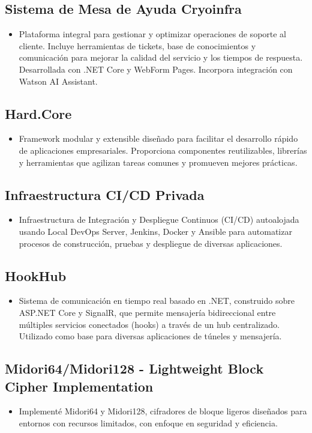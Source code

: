 \subsection*{Sistema de Mesa de Ayuda Cryoinfra}
\begin{itemize}[leftmargin=12pt]
    \item Plataforma integral para gestionar y optimizar operaciones de soporte al cliente. Incluye herramientas de tickets, base de conocimientos y comunicación para mejorar la calidad del servicio y los tiempos de respuesta. Desarrollada con .NET Core y WebForm Pages. Incorpora integración con Watson AI Assistant.
\end{itemize}

\subsection*{Hard.Core}
\begin{itemize}[leftmargin=12pt]
    \item Framework modular y extensible diseñado para facilitar el desarrollo rápido de aplicaciones empresariales. Proporciona componentes reutilizables, librerías y herramientas que agilizan tareas comunes y promueven mejores prácticas.
\end{itemize}

\subsection*{Infraestructura CI/CD Privada}
\begin{itemize}[leftmargin=12pt]
    \item Infraestructura de Integración y Despliegue Continuos (CI/CD) autoalojada usando Local DevOps Server, Jenkins, Docker y Ansible para automatizar procesos de construcción, pruebas y despliegue de diversas aplicaciones.
\end{itemize}

\subsection*{HookHub}
\begin{itemize}[leftmargin=12pt]
    \item Sistema de comunicación en tiempo real basado en .NET, construido sobre ASP.NET Core y SignalR, que permite mensajería bidireccional entre múltiples servicios conectados (hooks) a través de un hub centralizado. Utilizado como base para diversas aplicaciones de túneles y mensajería.
\end{itemize}

\subsection*{Midori64/Midori128 - Lightweight Block Cipher Implementation}
\begin{itemize}[leftmargin=12pt]
    \item Implementé Midori64 y Midori128, cifradores de bloque ligeros diseñados para entornos con recursos limitados, con enfoque en seguridad y eficiencia.
\end{itemize}

